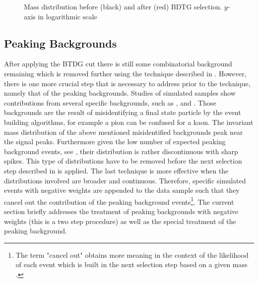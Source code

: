 \begin{figure}[h]
\begin{center}
  \scalebox{1}{}
  \caption{Mass distribution before (black) and after (red) BDTG selection. $y$-axis in logarithmic scale}
  \label{mass_BDTG_selection}
\end{center}
\end{figure}

\subsection{Peaking Backgrounds}
\label{peaking_backgrounds}

After applying the BTDG cut there is still some combinatorial background remaining which is removed
further using the \sPlot technique described in . However, there is
one more crucial step that is necessary to address prior to the \sPlot technique, namely that of the peaking backgrounds.
Studies of simulated samples show contributions from several specific backgrounds, such as \BsJpsiKK, \BsJpsipipi and \BdJpsipipi.
Those backgrounds are the result of misidentifying a final state particle by the event building algorithms, for example a pion can 
be confused for a kaon. The invariant mass distribution of the above mentioned misidentified backgrounds peak
near the \BJpsiKpi signal peaks. Furthermore given the low number of expected peaking background events, see ,
their distribution is rather discontinuous with sharp spikes. This type of distributions have to be removed
before the next selection step described in  is applied. The last technique is more effective
when the distributions involved are broader and continuous. Therefore, specific simulated events with negative weights
are appended to the data sample such that they cancel out the contribution of the peaking background 
events\footnote{The term "cancel out" obtains more meaning in the context of the likelihood of each event which is built in
the next selection step  based on a given mass \pdf. }.
The current section briefly addresses the treatment of peaking backgrounds with negative weights (this is a two step procedure)
as well as the special treatment of the \LbJpsippi peaking background.

